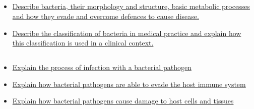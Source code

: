 \documentclass[10pt, a4paper]{article}
\begin{document}
\subsection{} \begin{itemize} \item \href{https://www.notion.so/034d7e2308754bdfbdecd0dae6febbc5}{Describe bacteria, their morphology and structure, basic metabolic processes and how they evade and overcome defences to cause disease.} \item \href{https://www.notion.so/b4052db2b8b1425b9b570d4a6e843758}{Describe the classification of bacteria in medical practice and explain how this classification is used in a clinical context.} \end{itemize}
\subsection{} \begin{itemize} \item \href{https://www.notion.so/ba2b675d036d4f3d8ba708157db952a1}{Explain the process of infection with a bacterial pathogen} \item \href{https://www.notion.so/96cb633fd935424ebec6cc01017cd40c}{Explain how bacterial pathogens are able to evade the host immune system} \item \href{https://www.notion.so/52439eb78eb54e42bef89dd495bfe1fb}{Explain how bacterial pathogens cause damage to host cells and tissues} \end{itemize}
\end{document}

